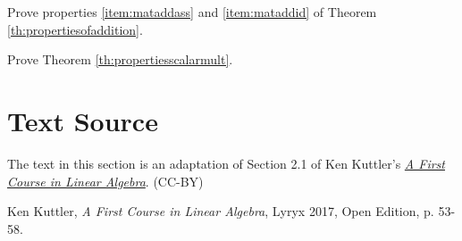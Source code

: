 \documentclass{ximera}
\begin{document}
\begin{problem}\label{prob:proofmataddass}
Prove properties \ref{item:mataddass} and  \ref{item:mataddid} of Theorem \ref{th:propertiesofaddition}.
\end{problem}

\begin{problem}\label{prob:proofpropertiesscalarmult}
Prove Theorem \ref{th:propertiesscalarmult}.
\end{problem}

\section*{Text Source}
The text in this section is an adaptation of Section 2.1 of Ken Kuttler's \href{https://open.umn.edu/opentextbooks/textbooks/a-first-course-in-linear-algebra-2017}{\it A First Course in Linear Algebra}. (CC-BY)

Ken Kuttler, {\it  A First Course in Linear Algebra}, Lyryx 2017, Open Edition, p. 53-58.
\end{document}
